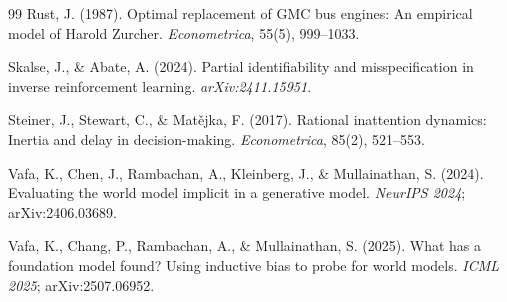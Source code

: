 \documentclass[11pt]{article}
\begin{document}
\begin{thebibliography}{99}
Rust, J. (1987). Optimal replacement of GMC bus engines: An empirical model
of Harold Zurcher. \emph{Econometrica}, 55(5), 999--1033.

Skalse, J., \& Abate, A. (2024). Partial identifiability and
misspecification in inverse reinforcement learning.
\emph{arXiv:2411.15951}.

Steiner, J., Stewart, C., \& Mat\v{e}jka, F. (2017). Rational inattention
dynamics: Inertia and delay in decision-making. \emph{Econometrica}, 85(2),
521--553.

Vafa, K., Chen, J., Rambachan, A., Kleinberg, J., \& Mullainathan, S.
(2024). Evaluating the world model implicit in a generative model.
\emph{NeurIPS 2024}; arXiv:2406.03689.

Vafa, K., Chang, P., Rambachan, A., \& Mullainathan, S. (2025). What has a
foundation model found? Using inductive bias to probe for world models.
\emph{ICML 2025}; arXiv:2507.06952.

\end{thebibliography}
\end{document}
